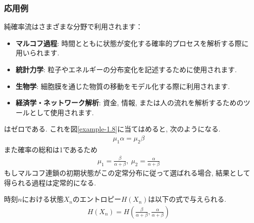 \documentclass[a4j]{jsarticle}
\begin{document}
{	\subsubsection*{応用例}
	純確率流はさまざまな分野で利用されます：

	\begin{itemize}
		\item \textbf{マルコフ過程}:
		      時間とともに状態が変化する確率的プロセスを解析する際に用いられます.
		\item \textbf{統計力学}:
		      粒子やエネルギーの分布変化を記述するために使用されます.
		\item \textbf{生物学}:
		      細胞膜を通じた物質の移動をモデル化する際に利用されます.
		\item \textbf{経済学・ネットワーク解析}:
		      資金, 情報, または人の流れを解析するためのツールとして使用されます.
	\end{itemize}


}
はゼロである. これを図\ref{example-1.8}に当てはめると, 次のようになる.
\begin{align}
	\mu_1\alpha = \mu_2\beta
\end{align}
また確率の総和は1であるため
\begin{align}
	\mu_1 = \frac{\beta}{\alpha + \beta},\: \mu_2 = \frac{\alpha}{\alpha + \beta}
\end{align}
もしマルコフ連鎖の初期状態がこの定常分布に従って選ばれる場合, 結果として得られる過程は定常的になる.

 時刻$n$における状態$X_n$のエントロピー$H(X_n)$は以下の式で与えられる.
\begin{align}
	H(X_n) = H\left(\frac{\beta}{\alpha + \beta}, \frac{\alpha}{\alpha + \beta}\right)
\end{align}
\end{document}
